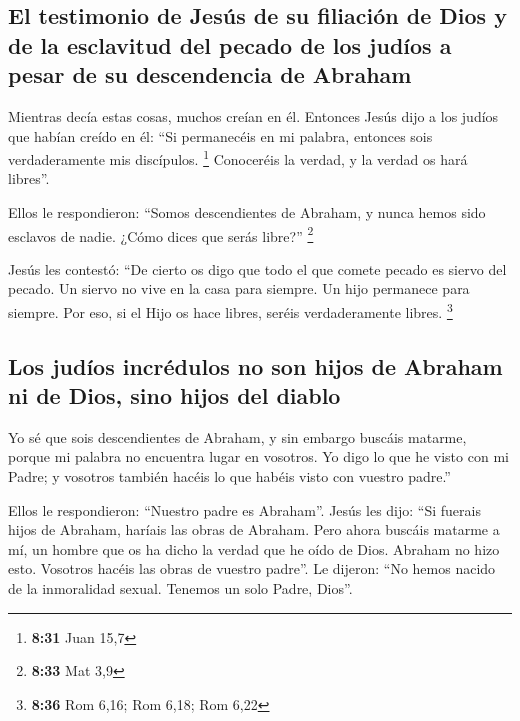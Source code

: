 \begin{paracol}{2}
{\subsection{El testimonio de Jesús de su filiación de Dios y de la
esclavitud del pecado de los judíos a pesar de su descendencia de
Abraham}\label{el-testimonio-de-jesuxfas-de-su-filiaciuxf3n-de-dios-y-de-la-esclavitud-del-pecado-de-los-juduxedos-a-pesar-de-su-descendencia-de-abraham}}

 Mientras decía estas cosas, muchos creían en él.
 Entonces Jesús dijo a los judíos que habían creído en
él: ``Si permanecéis en mi palabra, entonces sois verdaderamente mis
discípulos. \footnote{\textbf{8:31} Juan 15,7} 
Conoceréis la verdad, y la verdad os hará libres''.

 Ellos le respondieron: ``Somos descendientes de Abraham,
y nunca hemos sido esclavos de nadie. ¿Cómo dices que serás libre?''
\footnote{\textbf{8:33} Mat 3,9}

 Jesús les contestó: ``De cierto os digo que todo el que
comete pecado es siervo del pecado.  Un siervo no vive en
la casa para siempre. Un hijo permanece para siempre. 
Por eso, si el Hijo os hace libres, seréis verdaderamente libres.
\footnote{\textbf{8:36} Rom 6,16; Rom 6,18; Rom 6,22}

\hypertarget{los-juduxedos-incruxe9dulos-no-son-hijos-de-abraham-ni-de-dios-sino-hijos-del-diablo}{%
\subsection{Los judíos incrédulos no son hijos de Abraham ni de Dios,
sino hijos del
diablo}\label{los-juduxedos-incruxe9dulos-no-son-hijos-de-abraham-ni-de-dios-sino-hijos-del-diablo}}

 Yo sé que sois descendientes de Abraham, y sin embargo
buscáis matarme, porque mi palabra no encuentra lugar en vosotros.
 Yo digo lo que he visto con mi Padre; y vosotros también
hacéis lo que habéis visto con vuestro padre.''

 Ellos le respondieron: ``Nuestro padre es Abraham''.
Jesús les dijo: ``Si fuerais hijos de Abraham, haríais las obras de
Abraham.  Pero ahora buscáis matarme a mí, un hombre que
os ha dicho la verdad que he oído de Dios. Abraham no hizo esto.
 Vosotros hacéis las obras de vuestro padre''. Le
dijeron: ``No hemos nacido de la inmoralidad sexual. Tenemos un solo
Padre, Dios''.


\end{paracol}
